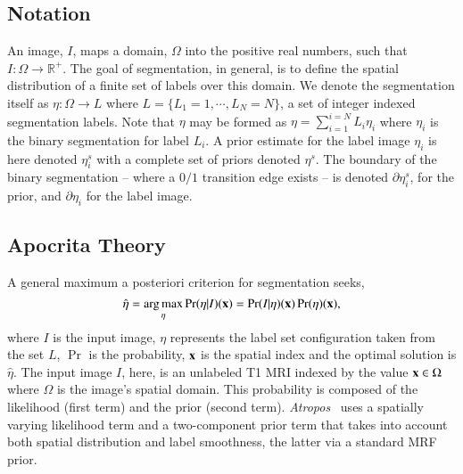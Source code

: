\documentclass[preprint,authoryear,12pt]{elsarticle}
\newcommand{\x}{{\bf x}}
\newcommand {\alg}{{\em Atropos}}
\DeclareMathOperator*{\argmax}{arg\,max}
\begin{document}
\subsection{Notation} An image, $I$, maps a domain, $\Omega$ into the
positive real numbers, such that $I \colon \Omega \rightarrow
\mathbb{R}^+$.  The goal of segmentation, in general, is to define the
spatial distribution of a finite set of labels over this domain.  We
denote the segmentation itself as $\eta \colon \Omega \rightarrow L$
where $L = \{ L_1 = 1 , \cdots , L_N=N \}$, a set of integer indexed
segmentation labels.  Note that $\eta$ may be formed as $\eta =
\sum_{i=1}^{i=N} L_i \eta_i $ where $\eta_i$ is the binary
segmentation for label $L_i$.  A prior estimate for the label image
$\eta_i$ is here denoted $\eta^s_i$ with a complete set of priors
denoted $\eta^s$.  The boundary of the binary segmentation -- where a
$0/1$ transition edge exists -- is denoted $\partial \eta^s_i$, for
the prior, and $\partial \eta_i$ for the label image.

\subsection{Apocrita Theory} A general maximum a posteriori criterion
for segmentation seeks,
\begin{equation} {\hat \eta} = \argmax _{\eta} \Pr( \eta | I )(\x) =
\Pr( I | \eta )(\x) \Pr(\eta)(\x),
\end{equation} where $I$ is the input image, ${\eta}$ represents the
label set configuration taken from the set $L$, $\Pr$ is the
probability, $\x$ is the spatial index and the optimal solution is
$\hat \eta$.  The input image $I$, here, is an unlabeled T1 MRI
indexed by the value $\x \in \Omega$ where $\Omega$ is the image's
spatial domain.  This probability is composed of the likelihood (first
term) and the prior (second term).  \alg~ uses a spatially varying
likelihood term and a two-component prior term that takes into account
both spatial distribution and label smoothness, the latter via a
standard MRF prior.
\end{document}
